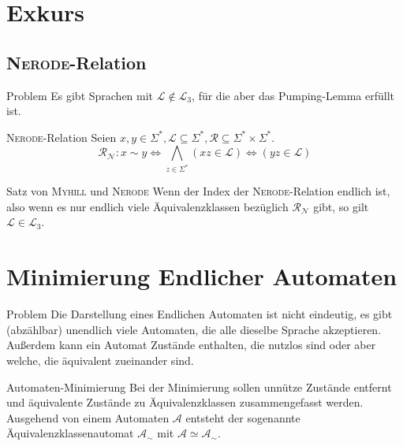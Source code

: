 \documentclass[]{beamer}
\begin{document}
\section{Exkurs}
\subsection{\textsc{Nerode}-Relation}
\begin{frame}[squeeze]{}
  \begin{alertblock}{Problem}
    Es gibt Sprachen mit $\mathcal{L} \notin \mathcal{L}_3$, für die aber das Pumping-Lemma erfüllt ist.
  \end{alertblock}
  
  \pause  
  
  \begin{exampleblock}{\textsc{Nerode}-Relation}
    Seien $x, y \in \Sigma^*, \mathcal{L} \subseteq \Sigma^*, \mathcal{R} \subseteq \Sigma^* \times \Sigma^*$.
    \[\mathcal{R_N} : x \sim y \Leftrightarrow \underset{z \in \Sigma^*}{\bigwedge} (xz \in \mathcal{L}) \Leftrightarrow (yz \in \mathcal{L})\]
  \end{exampleblock}
  
  \pause
  
  \begin{block}{Satz von \textsc{Myhill} und \textsc{Nerode}}
    Wenn der Index der \textsc{Nerode}-Relation endlich ist, also wenn es nur endlich viele Äquivalenzklassen bezüglich $\mathcal{R_N}$ gibt, so gilt $\mathcal{L} \in \mathcal{L}_3$.
  \end{block}
\end{frame}

\section{Minimierung Endlicher Automaten}
\begin{frame}[squeeze]{}
  \begin{alertblock}{Problem}
    Die Darstellung eines Endlichen Automaten ist nicht eindeutig, es gibt (abzählbar) unendlich viele Automaten, die alle dieselbe Sprache akzeptieren. \\
    \vspace*{0.5em}
    Außerdem kann ein Automat Zustände enthalten, die nutzlos sind oder aber welche, die äquivalent zueinander sind.
  \end{alertblock}
  
  \pause
  
  \begin{exampleblock}{Automaten-Minimierung}
    Bei der Minimierung sollen unnütze Zustände entfernt und äquivalente Zustände zu Äquivalenzklassen zusammengefasst werden. \\
    \vspace*{0.5em}
    Ausgehend von einem Automaten $\mathcal{A}$ entsteht der sogenannte Äquivalenzklassenautomat $\mathcal{A}_\sim$ mit $\mathcal{A} \simeq \mathcal{A}_\sim$.
  \end{exampleblock}
\end{frame}
\end{document}
